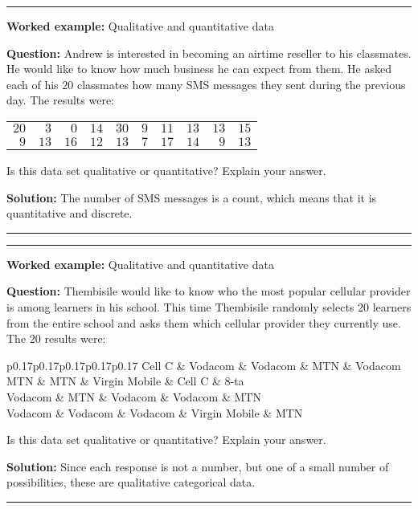 \documentclass[a4paper,11pt]{report}
\newenvironment{wex}[3]%
{\rule{\linewidth}{0.5mm}
\textbf{Worked example:} #1

\textbf{Question:} #2

\textbf{Solution:} #3}%
{\rule{\linewidth}{0.5mm}}
\begin{document}
\begin{wex}{Qualitative and quantitative data}{
    Andrew is interested in becoming an airtime reseller to his
    classmates. He would like to know how much business he can expect
    from them. He asked each of his $20$ classmates how many SMS
    messages they sent during the previous day. The results were:

    \begin{center}
      \begin{tabular}{rrrrrrrrrr}
        \toprule
        $20$ & $ 3$ & $ 0$ & $14$ & $30$ & $9$ & $11$ & $13$ & $13$ & $15$ \\
         $9$ & $13$ & $16$ & $12$ & $13$ & $7$ & $17$ & $14$ & $ 9$ & $13$ \\
        \bottomrule
      \end{tabular}
    \end{center}

    Is this data set qualitative or quantitative? Explain your answer.
}{
  The number of SMS messages is a count, which means that it is
  quantitative and discrete.

}
\end{wex}

\begin{wex}{Qualitative and quantitative data}{
    Thembisile would like to know who the most popular cellular
    provider is among learners in his school. This time Thembisile
    randomly selects $20$ learners from the entire school and asks them
    which cellular provider they currently use. The $20$ results were:

    \begin{center}
      \begin{tabular}{p{0.17\textwidth}p{0.17\textwidth}p{0.17\textwidth}p{0.17\textwidth}p{0.17\textwidth}}
        \toprule
        Cell C & Vodacom & Vodacom & MTN & Vodacom \\
        MTN & MTN & Virgin Mobile & Cell C & 8-ta \\
        Vodacom & MTN & Vodacom & Vodacom & MTN \\
        Vodacom & Vodacom & Vodacom & Virgin Mobile & MTN \\
        \bottomrule
      \end{tabular}
    \end{center}

    Is this data set qualitative or quantitative? Explain your answer.
}{
  Since each response is not a number, but one of a small number of
  possibilities, these are qualitative categorical data.

}
\end{wex}
\end{document}
